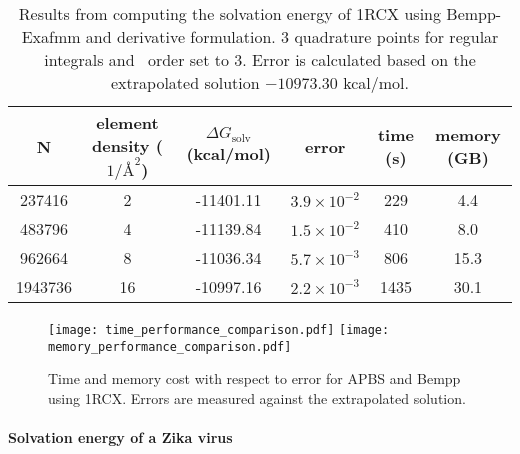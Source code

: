\begin{table*}[]
    \centering
    \begin{tabular}{cc|cc|cc}
    N       & element density ($1/ \si{\angstrom}^2$) & $\Delta G_{\mathrm{solv}}$ (kcal/mol) & error               & time (s) & memory (GB) \\ \hline
    237416  & 2                                       & -11401.11                             & $3.9\times 10^{-2}$ & 229      & 4.4         \\
    483796  & 4                                       & -11139.84                             & $1.5\times 10^{-2}$ & 410      & 8.0         \\
    962664  & 8                                       & -11036.34                             & $5.7\times 10^{-3}$ & 806      & 15.3        \\
    1943736 & 16                                      & -10997.16                             & $2.2\times 10^{-3}$ & 1435     & 30.1       
    \end{tabular}
    \caption{Results from computing the solvation energy of 1RCX using Bempp-Exafmm and derivative formulation.
    3 quadrature points for regular integrals and \fmm\ order set to 3.
    Error is calculated based on the extrapolated solution $-10973.30$ kcal/mol.}
    \label{tab:1RCX_bempp}
\end{table*}

\begin{figure*}
    \begin{center}
        \texttt{[image: time\_performance\_comparison.pdf]}
        \label{fig:time_performance_comparsion}\qquad
        \texttt{[image: memory\_performance\_comparison.pdf]}
        \label{fig:memory_performance_comparison}
    \end{center}
    \caption{Time and memory cost with respect to error for APBS and Bempp using 1RCX.
    Errors are measured against the extrapolated solution.
    }
    \label{fig:performance_comparison_apbs}
\end{figure*}

\paragraph{Solvation energy of a Zika virus} \label{result_zika}

